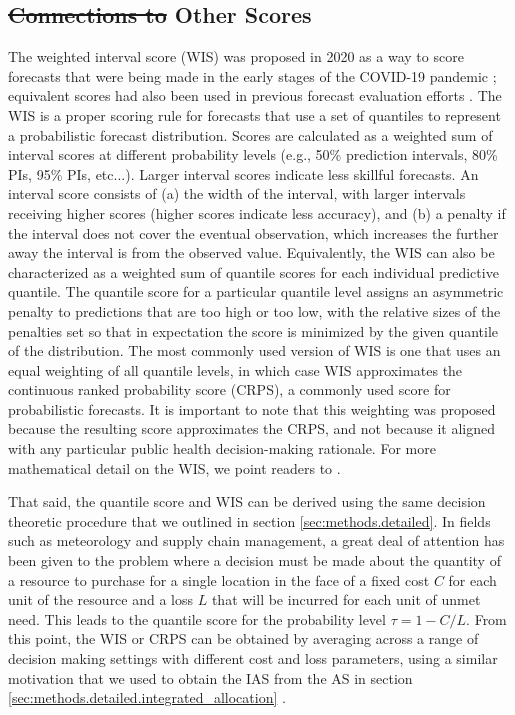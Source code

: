 \documentclass{article}\usepackage[]{graphicx}\usepackage[]{xcolor}
\providecommand{\DIFaddtex}[1]{{\protect\color{blue}\uwave{#1}}} %
\providecommand{\DIFdeltex}[1]{{\protect\color{red}\sout{#1}}}                      %
\providecommand{\DIFaddbegin}{} %
\providecommand{\DIFaddend}{} %
\providecommand{\DIFdelbegin}{} %
\providecommand{\DIFdelend}{} %
\providecommand{\DIFadd}[1]{\texorpdfstring{\DIFaddtex{#1}}{#1}} %
\providecommand{\DIFdel}[1]{\texorpdfstring{\DIFdeltex{#1}}{}} %
\newcommand{\DIFscaledelfig}{0.5}
\newlength{\DIFdelgraphicswidth} %
\newlength{\DIFdelgraphicsheight} %
\newcommand{\DIFaddincludegraphics}[2][]{{\color{blue}\fbox{\DIFOincludegraphics[#1]{#2}}}} %
\newcommand{\DIFdelincludegraphics}[2][]{%
\sbox{\DIFdelgraphicsbox}{\DIFOincludegraphics[#1]{#2}}%
\settoboxwidth{\DIFdelgraphicswidth}{\DIFdelgraphicsbox} %
\settoboxtotalheight{\DIFdelgraphicsheight}{\DIFdelgraphicsbox} %
\scalebox{\DIFscaledelfig}{%
\parbox[b]{\DIFdelgraphicswidth}{\usebox{\DIFdelgraphicsbox}\\[-\baselineskip] \rule{\DIFdelgraphicswidth}{0em}}\llap{\resizebox{\DIFdelgraphicswidth}{\DIFdelgraphicsheight}{%
\setlength{\unitlength}{\DIFdelgraphicswidth}%
\begin{picture}(1,1)%
\thicklines\linethickness{2pt} %
{\color[rgb]{1,0,0}\put(0,0){\framebox(1,1){}}}%
{\color[rgb]{1,0,0}\put(0,0){\line( 1,1){1}}}%
{\color[rgb]{1,0,0}\put(0,1){\line(1,-1){1}}}%
\end{picture}%
}\hspace*{3pt}}} %
} %
\DeclareRobustCommand{\DIFaddbegin}{\DIFOaddbegin \let\includegraphics\DIFaddincludegraphics} %
\DeclareRobustCommand{\DIFaddend}{\DIFOaddend \let\includegraphics\DIFOincludegraphics} %
\DeclareRobustCommand{\DIFdelbegin}{\DIFOdelbegin \let\includegraphics\DIFdelincludegraphics} %
\DeclareRobustCommand{\DIFdelend}{\DIFOaddend \let\includegraphics\DIFOincludegraphics} %
\begin{document}
\subsection{\DIFdelbegin \DIFdel{Connections to }\DIFdelend \DIFaddbegin \DIFadd{Comparisons with }\DIFaddend Other Scores}
\label{sec:methods.related}

The weighted interval score (WIS) was proposed in 2020 as a way to score forecasts that were being made in the early
stages of the COVID-19 pandemic \citep{bracher2021evaluating}; equivalent scores had also been used in previous forecast
evaluation efforts \cite[e.g.,][]{hong2016probabilisticEnergyForecasting}. The WIS is a proper scoring rule for
forecasts that use a set of quantiles to represent a probabilistic forecast distribution. Scores are calculated as a weighted sum of
interval scores at different probability levels (e.g., 50\% prediction intervals, 80\% PIs, 95\% PIs, etc...). Larger
interval scores indicate less skillful forecasts. An interval score consists of (a) the width of the interval, with
larger intervals receiving higher scores (higher scores indicate less accuracy), and (b) a penalty if the interval does
not cover the eventual observation, which increases the further away the interval is from the observed value.
Equivalently, the WIS can also be characterized as a weighted sum of quantile scores for each individual predictive
quantile. The quantile score for a particular quantile level assigns an asymmetric penalty to predictions that are too
high or too low, with the relative sizes of the penalties set so that in expectation the score is minimized by the given
quantile of the distribution. The most commonly used version of WIS is one that uses an equal weighting of all quantile
levels, in which case WIS approximates the continuous ranked probability score (CRPS), a commonly used score for
probabilistic forecasts. It is important to note that this weighting was proposed because the resulting score
approximates the CRPS, and not because it aligned with any particular public health decision-making rationale. For more mathematical detail on the WIS, we point readers to \cite{bracher2021evaluating}.

That said, the quantile score and WIS can be derived using the same decision theoretic procedure that we outlined in
section \ref{sec:methods.detailed}. In fields such as meteorology and supply chain management, a great deal of attention
has been given to the problem where a decision must be made about the quantity of a resource to purchase for a single
location in the face of a fixed cost $C$ for each unit of the resource and a loss $L$ that will be incurred for each
unit of unmet need. This leads to the quantile score for the probability level $\tau = 1 - C/L$. From this point, the
WIS or CRPS can be obtained by averaging across a range of decision making settings with different cost and loss
parameters, using a similar motivation that we used to obtain the IAS from the AS in section
\ref{sec:methods.detailed.integrated_allocation} \citep{gneiting2011weightedScoringRules}.
\end{document}
